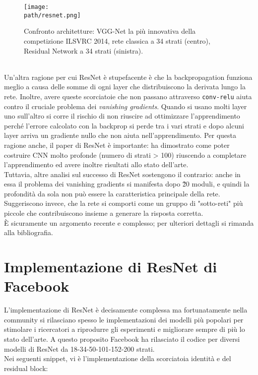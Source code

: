 \begin{figure}[h!]
 \centering
 \texttt{[image: \\path/resnet.png]} 
 \caption{Confronto architetture: VGG-Net la più innovativa della competizione ILSVRC 2014, rete classica a 34 strati (centro), Residual Network a 34 strati (sinistra). }
 \label{fig:resnet}
\end{figure}
\\
Un'altra ragione per cui ResNet è stupefacente è che la backpropagation funziona meglio a causa delle somme di ogni layer che distribuiscono la derivata lungo la rete. Inoltre, avere queste scorciatoie che non passano attraverso \texttt{conv-relu} aiuta contro il cruciale problema dei \emph{vanishing gradients}. Quando si usano molti layer uno sull'altro si corre il rischio di non riuscire ad ottimizzare l'apprendimento perché l'errore calcolato con la backprop si perde tra i vari strati e dopo alcuni layer arriva un gradiente nullo che non aiuta nell'apprendimento. Per questa ragione anche, il paper di ResNet è importante: ha dimostrato come poter costruire CNN molto profonde (numero di strati > 100) riuscendo a completare l'apprendimento ed avere inoltre risultati allo stato dell'arte. \\
Tuttavia, altre analisi sul successo di ResNet\parencite{restudy} sostengono il contrario: anche in essa il problema dei vanishing gradients si manifesta dopo \~20 moduli, e quindi la profondità da sola non può essere la caratteristica principale della rete. Suggeriscono invece, che la rete si comporti come un gruppo di "sotto-reti" più piccole che contribuiscono insieme a generare la risposta corretta.\\
È sicuramente un argomento recente e complesso; per ulteriori dettagli si rimanda alla bibliografia. 
\section{Implementazione di ResNet di Facebook}
L'implementazione di ResNet è decisamente complessa ma fortunatamente nella community si rilasciano spesso le implementazioni dei modelli più popolari per stimolare i ricercatori a riprodurre gli esperimenti e migliorare sempre di più lo stato dell'arte. A questo proposito Facebook ha rilasciato il codice per diversi modelli di ResNet da 18-34-50-101-152-200 strati. \\
Nei seguenti snippet, vi è l'implementazione della scorciatoia identità e del residual block: 

